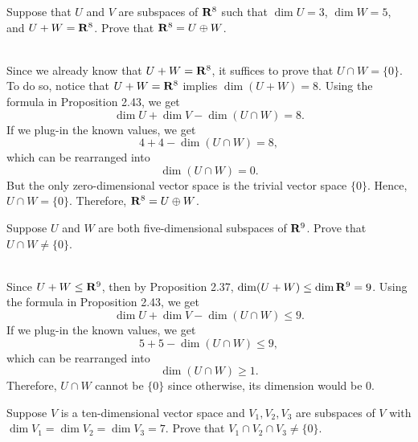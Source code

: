 \begin{exercise}
    Suppose that $U$ and $V$ are subspaces of $\mathbf{R}^8$ such that $\dim U = 3$, $\dim W = 5$, and $U+W = \mathbf{R}^8$. Prove that $\mathbf{R}^8 = U \oplus W$. \\
\end{exercise}

\begin{solution}
    \\ Since we already know that $U + W = \mathbf{R}^8$, it suffices to prove that $U \cap W = \{0\}$. To do so, notice that $U + W = \mathbf{R}^8$ implies $\dim (U + W) = 8$. Using the formula in Proposition 2.43, we get
    $$\dim U + \dim V - \dim(U\cap W) = 8.$$
    If we plug-in the known values, we get
    $$4 + 4 - \dim(U \cap W) = 8,$$
    which can be rearranged into
    $$\dim (U \cap W) = 0.$$
    But the only zero-dimensional vector space is the trivial vector space $\{0\}$. Hence, $U \cap W = \{0\}$. Therefore, $\mathbf{R}^8 = U \oplus W$. \\
\end{solution}

\begin{exercise}
    Suppose $U$ and $W$ are both five-dimensional subspaces of $\mathbf{R}^9$. Prove that $U \cap W \neq \{0\}$. \\
\end{exercise}

\begin{solution}
    \\ Since $U + W \leq \mathbf{R}^9$, then by Proposition 2.37, $\dim (U+W) \leq \dim \mathbf{R}^9 = 9$. Using the formula in Proposition 2.43, we get
    $$\dim U + \dim V - \dim(U\cap W) \leq 9.$$
    If we plug-in the known values, we get
    $$5 + 5 - \dim(U \cap W) \leq 9,$$
    which can be rearranged into
    $$\dim (U \cap W) \geq 1.$$
    Therefore, $U \cap W$ cannot be $\{0\}$ since otherwise, its dimension would be 0.\\ 
\end{solution}

\begin{exercise}
    Suppose $V$ is a ten-dimensional vector space and $V_1, V_2, V_3$ are subspaces of $V$ with $\dim V_1 = \dim V_2 = \dim V_3 = 7$. Prove that $V_1 \cap V_2 \cap V_3 \neq \{0\}$. \\
\end{exercise}

